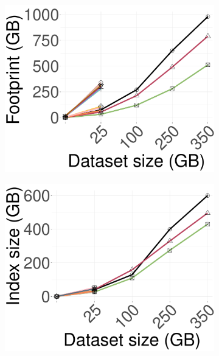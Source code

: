 \begin{figure}[!htb]
\begin{minipage}{0.28\textwidth}
\begin{subfigure}{\textwidth}
			\includegraphics[width=\textwidth]{../img/Experiments/Idx_footprint_datasets/idx_footprint_deep_n.pdf}
		\end{subfigure}	
		\caption{{Indexing Memory Footprint}}
		\label{fig:elpis:idx:footprint:memory}
	\end{minipage}	
 \hspace{0.15in}
	\begin{minipage}{0.29\textwidth}				
		\begin{subfigure}{\textwidth}
			\centering
			\captionsetup{justification=centering}	
			\includegraphics[width=\textwidth]{../img/Experiments/Idx_footprint_datasets/idx_indexsize_deep_n.pdf}

\end{subfigure}
\end{minipage}
\end{figure}
